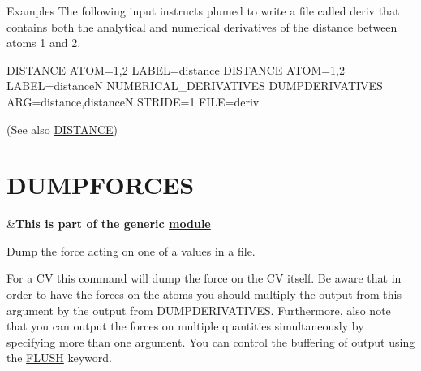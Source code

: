 \begin{DoxyParagraph}{Examples}
The following input instructs plumed to write a file called deriv that contains both the analytical and numerical derivatives of the distance between atoms 1 and 2. \begin{DoxyVerb}DISTANCE ATOM=1,2 LABEL=distance
DISTANCE ATOM=1,2 LABEL=distanceN NUMERICAL_DERIVATIVES
DUMPDERIVATIVES ARG=distance,distanceN STRIDE=1 FILE=deriv
\end{DoxyVerb}

\end{DoxyParagraph}
(See also \hyperlink{DISTANCE}{D\+I\+S\+T\+A\+N\+C\+E}) \hypertarget{DUMPFORCES}{}\section{D\+U\+M\+P\+F\+O\+R\+C\+E\+S}\label{DUMPFORCES}
\begin{TabularC}{2}
\hline
&{\bfseries  This is part of the generic \hyperlink{mymodules}{module }}   \\
\end{TabularC}
Dump the force acting on one of a values in a file.

For a C\+V this command will dump the force on the C\+V itself. Be aware that in order to have the forces on the atoms you should multiply the output from this argument by the output from D\+U\+M\+P\+D\+E\+R\+I\+V\+A\+T\+I\+V\+E\+S. Furthermore, also note that you can output the forces on multiple quantities simultaneously by specifying more than one argument. You can control the buffering of output using the \hyperlink{FLUSH}{F\+L\+U\+S\+H} keyword.

